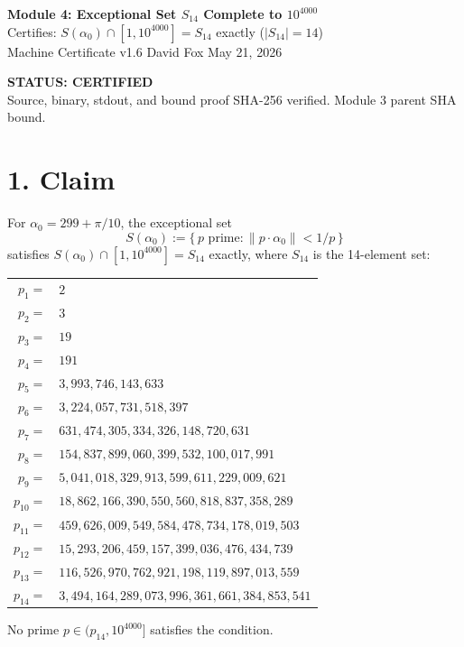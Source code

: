 \documentclass[11pt,letterpaper]{article}
\begin{document}
\begin{center}
{\Large\bfseries Module 4: Exceptional Set $S_{14}$ Complete to $10^{4000}$}\\[4pt]
{\large Certifies: $S(\alpha_0) \cap [1, 10^{4000}] = S_{14}$ exactly ($|S_{14}| = 14$)}\\[2pt]
{\normalsize Machine Certificate v1.6 \quad David Fox \quad May 21, 2026}
\end{center}
\vspace{0.5em}
\begin{center}
\colorbox{certgreen!15}{\parbox{0.85\textwidth}{\centering
\textcolor{certgreen}{\bfseries STATUS: CERTIFIED \checkmark}\\
Source, binary, stdout, and bound proof SHA-256 verified.
Module 3 parent SHA bound.
}}
\end{center}

\section*{1. Claim}

For $\alpha_0 = 299 + \pi/10$, the exceptional set
\[
  S(\alpha_0) := \{\,p \text{ prime} : \|p \cdot \alpha_0\| < 1/p\,\}
\]
satisfies $S(\alpha_0) \cap [1, 10^{4000}] = S_{14}$ exactly,
where $S_{14}$ is the 14-element set:
\begin{center}
\begin{tabular}{rl}
$p_1 =$ & $2$ \\
$p_2 =$ & $3$ \\
$p_3 =$ & $19$ \\
$p_4 =$ & $191$ \\
$p_5 =$ & $3{,}993{,}746{,}143{,}633$ \\
$p_6 =$ & $3{,}224{,}057{,}731{,}518{,}397$ \\
$p_7 =$ & $631{,}474{,}305{,}334{,}326{,}148{,}720{,}631$ \\
$p_8 =$ & $154{,}837{,}899{,}060{,}399{,}532{,}100{,}017{,}991$ \\
$p_9 =$ & $5{,}041{,}018{,}329{,}913{,}599{,}611{,}229{,}009{,}621$ \\
$p_{10} =$ & $18{,}862{,}166{,}390{,}550{,}560{,}818{,}837{,}358{,}289$ \\
$p_{11} =$ & $459{,}626{,}009{,}549{,}584{,}478{,}734{,}178{,}019{,}503$ \\
$p_{12} =$ & $15{,}293{,}206{,}459{,}157{,}399{,}036{,}476{,}434{,}739$ \\
$p_{13} =$ & $116{,}526{,}970{,}762{,}921{,}198{,}119{,}897{,}013{,}559$ \\
$p_{14} =$ & $3{,}494{,}164{,}289{,}073{,}996{,}361{,}661{,}384{,}853{,}541$ \\
\end{tabular}
\end{center}
No prime $p \in (p_{14}, 10^{4000}]$ satisfies the condition.
\end{document}
